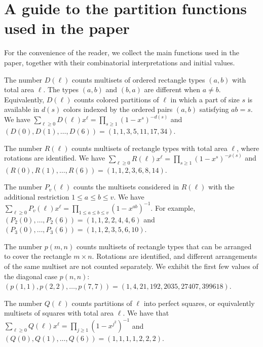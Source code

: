 \documentclass[12pt,a4paper]{amsart}
\numberwithin{equation}{section}
\theoremstyle{plain}
\theoremstyle{definition}
\theoremstyle{remark}
\begin{document}
\appendix

\section{A guide to the partition functions used in the paper}
For the convenience of the reader, we collect the main functions used in the paper, together with their combinatorial interpretations and initial values.

The number $D(\ell)$ counts multisets of ordered rectangle types $(a,b)$ with total area $\ell$. The types $(a,b)$ and $(b,a)$ are different when $a\neq b$. Equivalently, $D(\ell)$ counts colored partitions of $\ell$ in which a part of size $s$ is available in $d(s)$ colors indexed by the ordered pairs $(a,b)$ satisfying $ab=s$. We have $\sum_{\ell\geq0}D(\ell)x^\ell=\prod_{s\geq1}(1-x^s)^{-d(s)}$ and
$
(D(0),D(1),\ldots,D(6))=(1,1,3,5,11,17,34).
$

The number $R(\ell)$ counts multisets of rectangle types with total area $\ell$, where rotations are identified. We have $\sum_{\ell\geq0}R(\ell)x^\ell=\prod_{s\geq1}(1-x^s)^{-\rho(s)}$ and
$
(R(0),R(1),\ldots,R(6))=(1,1,2,3,6,8,14).
$

The number $P_v(\ell)$ counts the multisets considered in $R(\ell)$ with the additional restriction $1\le  a\le  b\le  v$. We have $\sum_{\ell\geq0}P_v(\ell)x^\ell=\prod_{1\le  a\le  b\le  v}(1-x^{ab})^{-1}$. For example,
$
(P_2(0),\ldots,P_2(6))=(1,1,2,2,4,4,6)
$
and
$
(P_3(0),\ldots,P_3(6))=(1,1,2,3,5,6,10).
$

The number $p(m,n)$ counts multisets of rectangle types that can be arranged to cover the rectangle $m\times n$. Rotations are identified, and different arrangements of the same multiset are not counted separately. We exhibit the first few values of the diagonal case $p(n,n)$: %
$
(p(1,1),p(2,2),\ldots,p(7,7))
=
(1,4,21,192,2035,27407,399618).
$

The number $Q(\ell)$ counts partitions of $\ell$ into perfect squares, or equivalently multisets of squares with total area $\ell$. We have that $\sum_{\ell\geq0}Q(\ell)x^\ell=\prod_{j\geq1}(1-x^{j^2})^{-1}$ and
$
(Q(0),Q(1),\ldots,Q(6))=(1,1,1,1,2,2,2).
$
\end{document}
